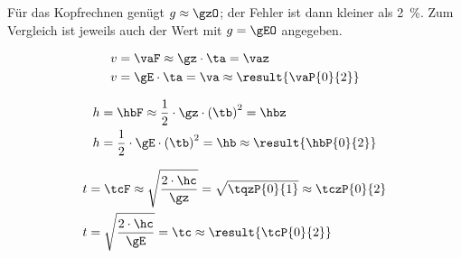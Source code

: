 Für das Kopfrechnen genügt $g \approx \gzO$; der Fehler ist dann kleiner als \SI{2}{\percent}. Zum Vergleich ist jeweils auch der Wert mit $g = \gEO$ angegeben.
\begin{abcliste}
\abc
\begin{align}
 v &= \vaF \approx \gz\cdot\ta = \vaz \\
 v &= \gE\cdot\ta = \va \approx \result{\vaP{0}{2}}
\end{align}

\abc
\begin{align}
 h &= \hbF \approx \frac{1}{2}\cdot\gz\cdot\left(\tb\right)^2 = \hbz \\
 h &= \frac{1}{2}\cdot\gE\cdot\left(\tb\right)^2 = \hb \approx \result{\hbP{0}{2}}
\end{align}

\abc
\begin{align}
 t &= \tcF \approx \sqrt{\frac{2\cdot\hc}{\gz}} = \sqrt{\tqzP{0}{1}} \approx \tczP{0}{2} \\
 t &= \sqrt{\frac{2\cdot\hc}{\gE}} = \tc \approx \result{\tcP{0}{2}}
\end{align}
\end{abcliste}
